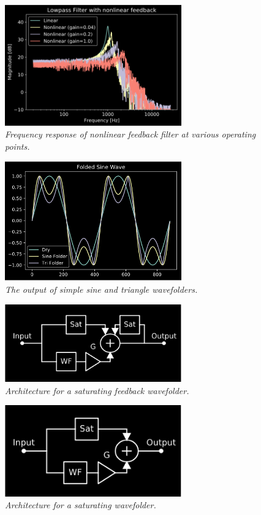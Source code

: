 \documentclass[twoside,a4paper]{article}
\begin{document}
%
\begin{figure}[!htb]
    \center
    \includegraphics[width=3in]{../NonlinearFeedback/Pics/LPF-NL.png}
    \caption{\label{nlfd-lpf}{\it Frequency response of nonlinear feedback filter at
    various operating points.}}
\end{figure}
%
\begin{figure}[!htb]
    \center
    \includegraphics[width=3in]{../Wavefolder/Pics/simple_fold.png}
    \caption{\label{simple_fold}{\it The output of simple sine and triangle wavefolders.}}
\end{figure}
%
\begin{figure}[!htb]
    \center
    \includegraphics[width=3in]{../Wavefolder/Pics/fb_arch.png}
    \caption{\label{fb_wave}{\it Architecture for a saturating feedback wavefolder.}}
\end{figure}
%
\begin{figure}[!htb]
    \center
    \includegraphics[width=3in]{../Wavefolder/Pics/sat_arch.png}
    \caption{\label{sat_wave}{\it Architecture for a saturating wavefolder.}}
\end{figure}
%
\end{document}
